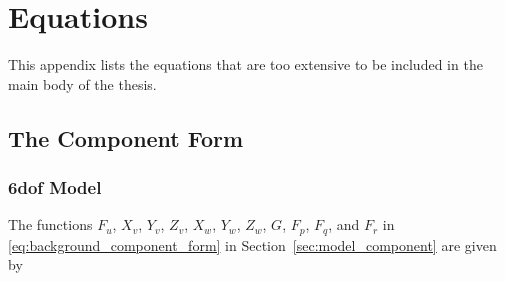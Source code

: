 \chapter{Equations}
This appendix lists the equations that are too extensive to be included in the main body of the thesis.
\allowdisplaybreaks

\section{The Component Form}
\label{app:component_form}
\subsection{6\gls{dof} Model}
The functions $F_u$, $X_v$, $Y_v$, $Z_v$, $X_w$, $Y_w$, $Z_w$, $G$, $F_p$, $F_q$, and $F_r$ in \eqref{eq:background_component_form} in Section~\ref{sec:model_component} are given by
